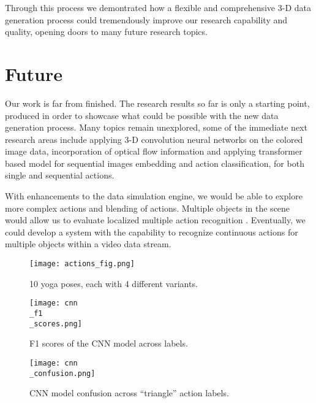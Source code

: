 \documentclass[
	a4paper, %
	10pt, %
	unnumberedsections, %
	twoside, %
]{t0004}
\begin{document}
Through this process we demontrated how a flexible and comprehensive 3-D data generation process could tremendously improve our research capability and quality, opening doors to many future research topics. 

\section{Future}

Our work is far from finished. The research results so far is only a starting point, produced in order to showcase what could be possible with the new data generation process. Many topics remain unexplored, some of the immediate next research areas include applying 3-D convolution neural networks on the colored image data, incorporation of optical flow information and applying transformer based model for sequential images embedding and action classification, for both single and sequential actions.

With enhancements to the data simulation engine, we would be able to explore more complex actions and blending of actions. Multiple objects in the scene would allow us to evaluate localized multiple action recognition \cite{Wu:2023qr}. Eventually, we could develop a system with the capability to recognize continuous actions for multiple objects within a video data stream.






\begin{figure*}
	\texttt{[image: actions\_fig.png]}
	\caption{10 yoga poses, each with 4 different variants.}
	\label{fig:actionsfig}
\end{figure*}

\begin{figure*}
	\texttt{[image: cnn\\\_f1\\\_scores.png]}
	\caption{F1 scores of the CNN model across labels.}
	\label{fig:f1cnn}
\end{figure*}

\begin{figure*}
	\texttt{[image: cnn\\\_confusion.png]}
	\caption{CNN model confusion across ``triangle'' action labels.}
	\label{fig:f1cnn}
\end{figure*}
\end{document}
